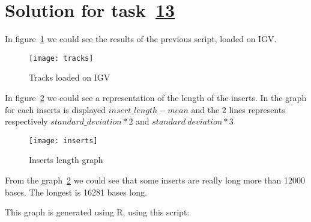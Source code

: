 \section{Solution for task~\hyperref[itm:2.13]{13}}
In figure~\ref{fig:tracks} we could see the results of the previous script,
loaded on IGV.
\begin{figure}[H]
\texttt{[image: tracks]}
\caption{Tracks loaded on IGV}
\label{fig:tracks}
\end{figure}

In figure~\ref{fig:inserts} we could see a representation of the length of the
inserts. In the graph for each inserts is displayed $insert\_length - mean$ and
the 2 lines represents respectively $standard\_deviation * 2$ and $standard\
deviation * 3$
\begin{figure}[H]
\centering
\texttt{[image: inserts]}
\caption{Inserts length graph}
\label{fig:inserts}
\end{figure}

From the graph~\ref{fig:inserts} we could see that some inserts are really long
more than 12000 bases. The longest is 16281 bases long.

This graph is generated using R, using this script:

